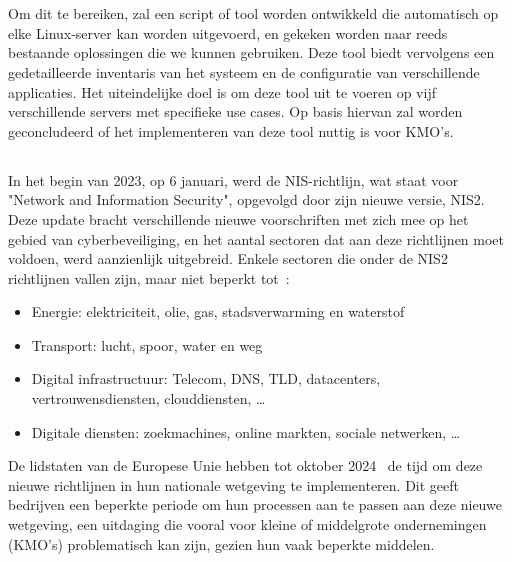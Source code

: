 
\chapter{}%
\label{ch:inleiding}

Om dit te bereiken, zal een script of tool worden ontwikkeld die automatisch op elke Linux-server kan worden uitgevoerd, en gekeken worden naar reeds bestaande oplossingen die we kunnen gebruiken.
Deze tool biedt vervolgens een gedetailleerde inventaris van het systeem en de configuratie van verschillende applicaties.
Het uiteindelijke doel is om deze tool uit te voeren op vijf verschillende servers met specifieke use cases.
Op basis hiervan zal worden geconcludeerd of het implementeren van deze tool nuttig is voor KMO's.

\section{}%
\label{sec:probleemstelling}

In het begin van 2023, op 6 januari, werd de NIS-richtlijn, wat staat voor "Network and Information Security", opgevolgd door zijn nieuwe versie, NIS2.
Deze update bracht verschillende nieuwe voorschriften met zich mee op het gebied van cyberbeveiliging, en het aantal sectoren dat aan deze richtlijnen moet voldoen, werd aanzienlijk uitgebreid.
Enkele sectoren die onder de NIS2 richtlijnen vallen zijn, maar niet beperkt tot~\autocite{NIS2Directive2022}:
\begin{itemize}
    \item Energie: elektriciteit, olie, gas, stadsverwarming en waterstof
    \item Transport: lucht, spoor, water en weg
    \item Digital infrastructuur: Telecom, DNS, TLD, datacenters, vertrouwensdiensten, clouddiensten, \ldots
    \item Digitale diensten: zoekmachines, online markten, sociale netwerken, \ldots
\end{itemize}

De lidstaten van de Europese Unie hebben tot oktober 2024~\autocite{NIS2Directive2022} de tijd om deze nieuwe richtlijnen in hun nationale wetgeving te implementeren.
Dit geeft bedrijven een beperkte periode om hun processen aan te passen aan deze nieuwe wetgeving, een uitdaging die vooral voor kleine of middelgrote ondernemingen (KMO's) problematisch kan zijn, gezien hun vaak beperkte middelen.


